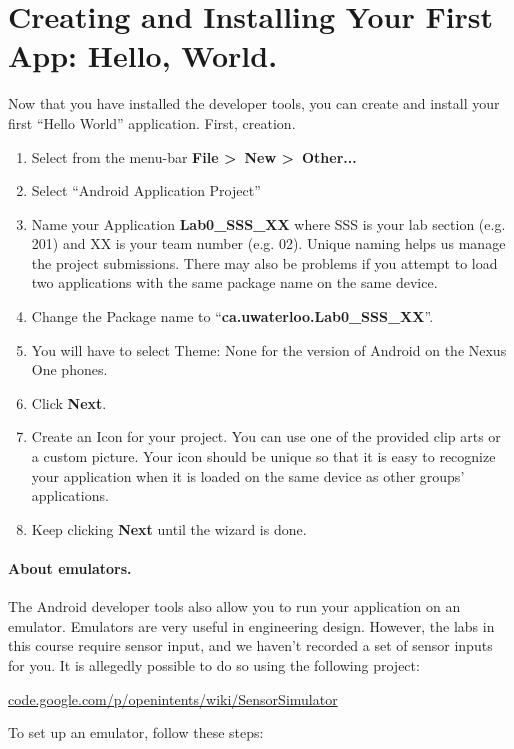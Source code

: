 \documentclass[10pt]{article}
\begin{document}
\section{Creating and Installing Your First App: Hello, World.} Now that you have installed the developer tools, you can create and install your first ``Hello World'' application. First, creation.

\begin{enumerate}
\item Select from the menu-bar \textbf{File \textgreater~New
  \textgreater~Other...}
\item Select ``Android Application Project''
\item Name your Application \textbf{Lab0\_SSS\_XX} where SSS is your lab section (e.g. 201) and XX is your team number (e.g. 02). Unique naming helps us manage the project submissions. There may also be problems if you attempt to load two applications with the same package name on the same device.
\item Change the Package name to ``{\bf ca.uwaterloo.Lab0\_SSS\_XX}''.
\item You will have to select Theme: None for the version of Android on the Nexus One phones.
\item Click \textbf{Next}.
\item Create an Icon for your project. You can use one of the provided clip arts or a custom picture. Your icon should be unique so that it is easy to recognize your application when it is loaded on the same device as other groups' applications.
\item Keep clicking \textbf{Next} until the wizard is done.
\end{enumerate}

\paragraph{About emulators.} The Android developer tools also allow you to run your application on an emulator. Emulators are very useful in engineering design. However, the labs in this course require sensor input, and we haven't recorded a set of sensor inputs for you. It is allegedly possible to do so using the following project:

\begin{center}
\url{code.google.com/p/openintents/wiki/SensorSimulator}
\end{center}

To set up an emulator, follow these steps:
\end{document}

